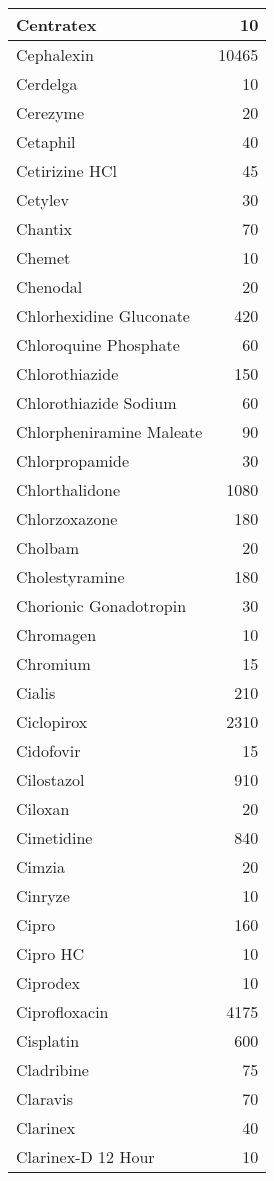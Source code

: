 \documentclass[
]{article}
\begin{document}
\begin{table}
\begin{tabular}[t]{l|r}
\hline
Centratex & 10\\
\hline
Cephalexin & 10465\\
\hline
Cerdelga & 10\\
\hline
Cerezyme & 20\\
\hline
Cetaphil & 40\\
\hline
Cetirizine HCl & 45\\
\hline
Cetylev & 30\\
\hline
Chantix & 70\\
\hline
Chemet & 10\\
\hline
Chenodal & 20\\
\hline
Chlorhexidine Gluconate & 420\\
\hline
Chloroquine Phosphate & 60\\
\hline
Chlorothiazide & 150\\
\hline
Chlorothiazide Sodium & 60\\
\hline
Chlorpheniramine Maleate & 90\\
\hline
Chlorpropamide & 30\\
\hline
Chlorthalidone & 1080\\
\hline
Chlorzoxazone & 180\\
\hline
Cholbam & 20\\
\hline
Cholestyramine & 180\\
\hline
Chorionic Gonadotropin & 30\\
\hline
Chromagen & 10\\
\hline
Chromium & 15\\
\hline
Cialis & 210\\
\hline
Ciclopirox & 2310\\
\hline
Cidofovir & 15\\
\hline
Cilostazol & 910\\
\hline
Ciloxan & 20\\
\hline
Cimetidine & 840\\
\hline
Cimzia & 20\\
\hline
Cinryze & 10\\
\hline
Cipro & 160\\
\hline
Cipro HC & 10\\
\hline
Ciprodex & 10\\
\hline
Ciprofloxacin & 4175\\
\hline
Cisplatin & 600\\
\hline
Cladribine & 75\\
\hline
Claravis & 70\\
\hline
Clarinex & 40\\
\hline
Clarinex-D 12 Hour & 10\\

\end{tabular}
\end{table}
\end{document}
